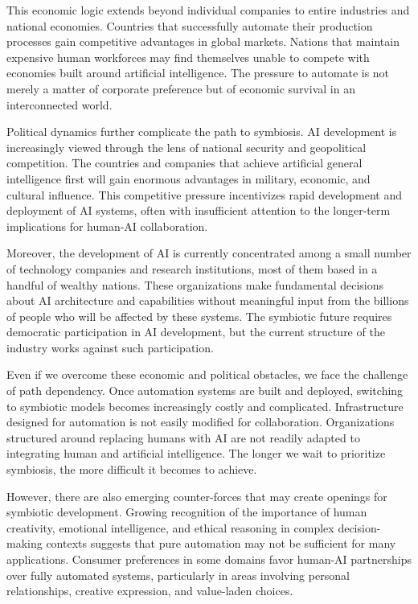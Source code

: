 This economic logic extends beyond individual companies to entire industries and national economies. Countries that successfully automate their production processes gain competitive advantages in global markets. Nations that maintain expensive human workforces may find themselves unable to compete with economies built around artificial intelligence. The pressure to automate is not merely a matter of corporate preference but of economic survival in an interconnected world.

Political dynamics further complicate the path to symbiosis. AI development is increasingly viewed through the lens of national security and geopolitical competition. The countries and companies that achieve artificial general intelligence first will gain enormous advantages in military, economic, and cultural influence. This competitive pressure incentivizes rapid development and deployment of AI systems, often with insufficient attention to the longer-term implications for human-AI collaboration.

Moreover, the development of AI is currently concentrated among a small number of technology companies and research institutions, most of them based in a handful of wealthy nations. These organizations make fundamental decisions about AI architecture and capabilities without meaningful input from the billions of people who will be affected by these systems. The symbiotic future requires democratic participation in AI development, but the current structure of the industry works against such participation.

Even if we overcome these economic and political obstacles, we face the challenge of path dependency. Once automation systems are built and deployed, switching to symbiotic models becomes increasingly costly and complicated. Infrastructure designed for automation is not easily modified for collaboration. Organizations structured around replacing humans with AI are not readily adapted to integrating human and artificial intelligence. The longer we wait to prioritize symbiosis, the more difficult it becomes to achieve.

However, there are also emerging counter-forces that may create openings for symbiotic development. Growing recognition of the importance of human creativity, emotional intelligence, and ethical reasoning in complex decision-making contexts suggests that pure automation may not be sufficient for many applications. Consumer preferences in some domains favor human-AI partnerships over fully automated systems, particularly in areas involving personal relationships, creative expression, and value-laden choices.

